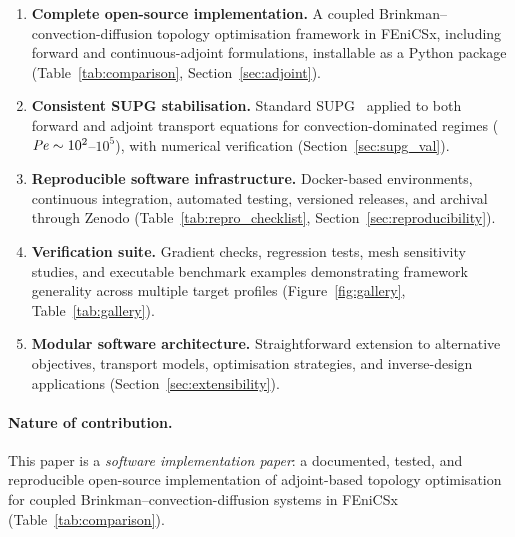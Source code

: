 \begin{enumerate}
    \item \textbf{Complete open-source implementation.}
          A coupled Brinkman--convection-diffusion topology
          optimisation framework in FEniCSx, including forward
          and continuous-adjoint formulations, installable
          as a Python package
          (Table~\ref{tab:comparison}, Section~\ref{sec:adjoint}).

    \item \textbf{Consistent SUPG stabilisation.}
          Standard SUPG~\cite{brooks1982,donea2003} applied to
          both forward and adjoint transport equations for
          convection-dominated regimes ($\mathit{Pe}\sim10^2$--$10^5$),
          with numerical verification
          (Section~\ref{sec:supg_val}).

    \item \textbf{Reproducible software infrastructure.}
          Docker-based environments, continuous integration,
          automated testing, versioned releases, and archival
          through Zenodo
          (Table~\ref{tab:repro_checklist},
          Section~\ref{sec:reproducibility}).

    \item \textbf{Verification suite.}
          Gradient checks, regression tests, mesh sensitivity
          studies, and executable benchmark examples
          demonstrating framework generality across multiple
          target profiles
          (Figure~\ref{fig:gallery}, Table~\ref{tab:gallery}).

    \item \textbf{Modular software architecture.}
          Straightforward extension to alternative objectives,
          transport models, optimisation strategies, and
          inverse-design applications
          (Section~\ref{sec:extensibility}).
\end{enumerate}

\paragraph{Nature of contribution.}
This paper is a \emph{software implementation paper}:
a documented, tested, and reproducible open-source implementation
of adjoint-based topology optimisation for coupled
Brinkman--convection-diffusion systems in FEniCSx
(Table~\ref{tab:comparison}).

